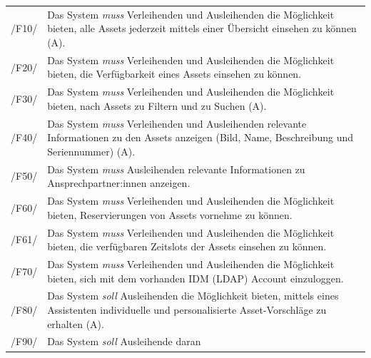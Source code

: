 \begin{center}
        \renewcommand{\arraystretch}{1.5}
        \begin{longtable}{lp{}} \arrayrulecolor{maincolor}\hline
                 \sffamily\color{maincolor}/F10/  & Das System \textit{muss} Verleihenden und
                Ausleihenden die Möglichkeit bieten, alle Assets jederzeit mittels einer Übersicht
                einsehen zu können (A). \\
                 \sffamily\color{maincolor}/F20/  & Das System \textit{muss}  Verleihenden und
                 Ausleihenden die Möglichkeit bieten, die Verfügbarkeit eines Assets einsehen zu
                 können. \\
                 \sffamily\color{maincolor}/F30/  & Das System \textit{muss} Verleihenden und
                 Ausleihenden die Möglichkeit bieten, nach Assets zu Filtern und zu Suchen (A). \\
                 \sffamily\color{maincolor}/F40/  & Das System \textit{muss}  Verleihenden und
                Ausleihenden relevante Informationen zu den Assets anzeigen (Bild, Name,
                Beschreibung und Seriennummer) (A). \\
                 \sffamily\color{maincolor}/F50/  & Das System \textit{muss}  Ausleihenden relevante
                 Informationen zu Ansprechpartner:innen anzeigen. \\
                 \sffamily\color{maincolor}/F60/  & Das System \textit{muss} Verleihenden und
                 Ausleihenden die Möglichkeit bieten, Reservierungen von Assets vornehme zu können.
                 \\
                 \sffamily\color{maincolor}/F61/  & Das System \textit{muss} Verleihenden und
                 Ausleihenden die Möglichkeit bieten, die verfügbaren Zeitslots der Assets einsehen
                 zu können. \\
                 \sffamily\color{maincolor}/F70/  & Das System \textit{muss} Verleihenden und
                 Ausleihenden die Möglichkeit bieten, sich mit dem vorhanden IDM (LDAP) Account
                 einzuloggen. \\
                 \sffamily\color{maincolor}/F80/  & Das System \textit{soll} Ausleihenden die
                Möglichkeit bieten, mittels eines Assistenten individuelle und personalisierte
                Asset-Vorschläge zu erhalten (A). \\
                 \sffamily\color{maincolor}/F90/  & Das System \textit{soll} Ausleihende daran

\end{longtable}
\end{center}
